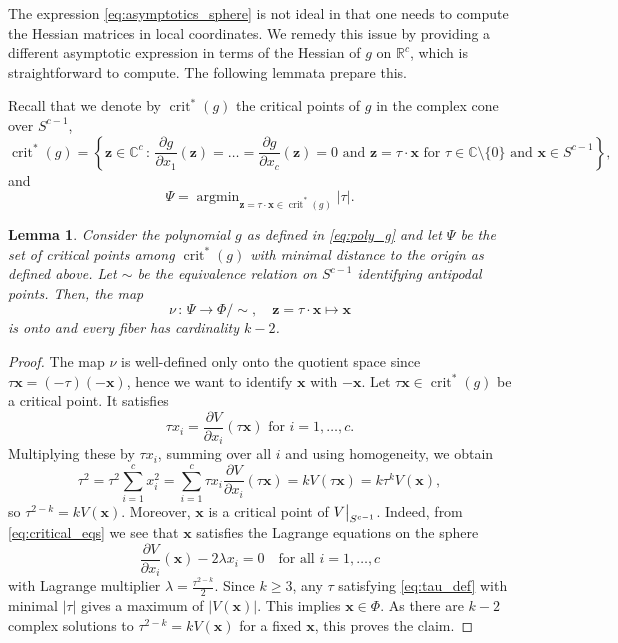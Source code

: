 \documentclass[a4paper,oneside]{amsart}
\newcommand{\bb}[1]{\boldsymbol{#1}}
\numberwithin{theorem}{section}
\newtheorem{lemma}[theorem]{Lemma}
\theoremstyle{remark}
\DeclareMathOperator{\argmin}{argmin}
\newcommand{\R}{\mathbb{R}}
\newcommand{\C}{\mathbb{C}}
\DeclareMathOperator{\crit}{crit}
\newcommand\restr[2]{{
  \left.\kern-\nulldelimiterspace 
  #1
  \vphantom{\big|} 
  \right|_{#2}
  }}
\begin{document}
The expression \eqref{eq:asymptotics_sphere} is not ideal in that one needs to compute the Hessian matrices in local coordinates. We remedy this issue by providing a different asymptotic expression in terms of the Hessian of $g$ on $\R^c$, which is straightforward to compute. The following lemmata prepare this.

Recall that we denote by $\crit^*(g)$ the critical points of $g$ in the complex cone over $S^{c-1}$,
\[
\crit^*(g) = \left\{ \bb{z} \in \C^c \,:\, \frac{\partial g}{\partial x_1}(\bb{z}) =\ldots = \frac{\partial g}{\partial x_c}(\bb{z}) = 0 \text{ and } \bb{z} = \tau \cdot \bb x \text{ for } \tau \in \C\setminus\{0\} \text{ and } \bb x \in S^{c-1} \right\} ,
\]
and 
\[
  \Psi = \argmin_{\bb z= \tau \cdot \bb x \in \crit^*(g)} |\tau|.
\] 

\begin{lemma}
  \label{lem:critical_point_identification}
  Consider the polynomial $g$ as defined in \eqref{eq:poly_g} and let $\Psi$ be the set of critical points among $\crit^*(g)$ with minimal distance to the origin as defined above. Let $\sim$ be the equivalence relation on $S^{c-1}$ identifying antipodal points. Then, the map 
  \[
    \nu \,:\, \Psi \rightarrow \Phi / \sim, \quad \bb{z} = \tau\cdot \bb{x} \mapsto \bb{x}
  \]
  is onto and every fiber has cardinality $k-2$.
\end{lemma}


\begin{proof}
    The map $\nu$ is well-defined only onto the quotient space since $\tau \bb x = (-\tau) (-\bb x)$, hence we want to identify $\bb x$ with $-\bb x$.
  Let $\tau\bb{x}\in\crit^*(g)$ be a critical point. It satisfies
  \begin{equation}
    \label{eq:critical_eqs}
    \tau x_i = \frac{\partial V}{\partial x_i}(\tau \bb{x}) \text{ for } i=1,\dots,c.
  \end{equation}
  Multiplying these by $\tau x_i$, summing over all $i$ and using homogeneity, we obtain
  \begin{equation}
    \label{eq:tau_def}
    \tau^2 = \tau^2 \sum_{i=1}^{c} x_i^2 = \sum_{i=1}^c \tau x_i \frac{\partial V}{\partial x_i}(\tau \bb{x}) = kV(\tau \bb{x}) = k \tau^k V(\bb{x}),
  \end{equation}
  so $\tau^{2-k} = kV(\bb{x})$. Moreover, $\bb{x}$ is a critical point of $\restr{V}{S^{c-1}}$. Indeed, from \eqref{eq:critical_eqs} we see that $\bb{x}$ satisfies the Lagrange equations on the sphere
  \[
    \frac{\partial V}{\partial x_i}(\bb{x}) - 2\lambda x_i = 0 \quad \text{for all } i=1,\dots,c
  \]
  with Lagrange multiplier $\lambda = \tfrac{\tau^{2-k}}{2}$.
  Since $k\geq 3$, any $\tau$ satisfying \eqref{eq:tau_def} with minimal $|\tau|$ gives a maximum of $|V(\bb{x})|$. This implies $\bb{x}\in\Phi$. As there are $k-2$ complex solutions to $\tau^{2-k} = kV(\bb{x})$ for a fixed $\bb{x}$, this proves the claim. 
\end{proof}
\end{document}
